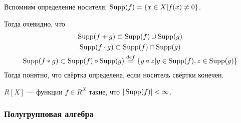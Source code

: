 \documentclass[a4paper]{report}
\begin{document}
    Вспомним определение носителя: $\operatorname{Supp}(f) = \left\{x \in X\middle|f(x) \ne 0\right\}$.

    Тогда очевидно, что \begin{gather*}
                            \operatorname{Supp}(f + g) \subset \operatorname{Supp}(f) \cup \operatorname{Supp}(g)\\
                            \operatorname{Supp}(f \cdot g)\subset \operatorname{Supp}(f) \cap \operatorname{Supp}(g)\\
                            \operatorname{Supp}(f * g) \subset \operatorname{Supp}(f) \circ \operatorname{Supp}(g) \overset{def}{=} \left\{y \circ z\middle|y \in \operatorname{Supp}(f), z \in \operatorname{Supp}(g)\right\}\\
    \end{gather*}
    Тогда понятно, что свёртка определена, если носитель свёртки конечен.

    $R[X]$ --- функции $f \in R^X$ такие, что $|\operatorname{Supp}(f)| < \infty$.


    \subsubsection{Полугрупповая алгебра}
\end{document}
